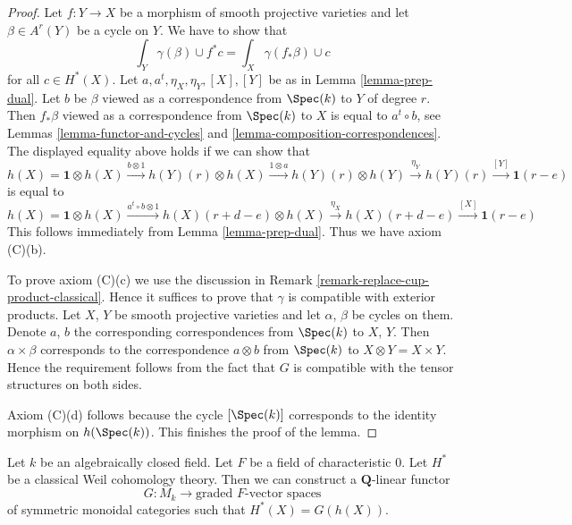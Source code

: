 \begin{proof}
\medskip\noindent
Let $f : Y \to X$ be a morphism of smooth projective varieties and
let $\beta \in A^r(Y)$ be a cycle on $Y$. We have to show that
$$
\int_Y \gamma(\beta) \cup f^*c = \int_X \gamma(f_*\beta) \cup c
$$
for all $c \in H^*(X)$. Let $a, a^t, \eta_X, \eta_Y, [X], [Y]$
be as in Lemma \ref{lemma-prep-dual}.
Let $b$ be $\beta$ viewed as a correspondence from $\Spec(k)$ to $Y$
of degree $r$. Then $f_*\beta$ viewed as a correspondence from
$\Spec(k)$ to $X$ is equal to $a^t \circ b$, see
Lemmas \ref{lemma-functor-and-cycles} and
\ref{lemma-composition-correspondences}.
The displayed equality above holds if we can show that
$$
h(X) = \mathbf{1} \otimes h(X)
\xrightarrow{b \otimes 1}
h(Y)(r) \otimes h(X)
\xrightarrow{1 \otimes a}
h(Y)(r) \otimes h(Y)
\xrightarrow{\eta_Y}
h(Y)(r)
\xrightarrow{[Y]}
\mathbf{1}(r - e)
$$
is equal to
$$
h(X) = \mathbf{1} \otimes h(X)
\xrightarrow{a^t \circ b \otimes 1}
h(X)(r + d - e) \otimes h(X)
\xrightarrow{\eta_X}
h(X)(r + d - e)
\xrightarrow{[X]}
\mathbf{1}(r - e)
$$
This follows immediately from Lemma \ref{lemma-prep-dual}.
Thus we have axiom (C)(b).

\medskip\noindent
To prove axiom (C)(c) we use the discussion in
Remark \ref{remark-replace-cup-product-classical}.
Hence it suffices to prove that $\gamma$ is compatible with
exterior products. Let $X$, $Y$ be smooth projective varieties and
let $\alpha$, $\beta$ be cycles on them. Denote
$a$, $b$ the corresponding correspondences from $\Spec(k)$ to
$X$, $Y$. Then $\alpha \times \beta$ corresponds to the
correspondence $a \otimes b$ from $\Spec(k)$ to $X \otimes Y = X \times Y$.
Hence the requirement follows from the fact that $G$ is
compatible with the tensor structures on both sides.

\medskip\noindent
Axiom (C)(d) follows because the cycle $[\Spec(k)]$
corresponds to the identity morphism on $h(\Spec(k))$.
This finishes the proof of the lemma.
\end{proof}

\begin{lemma}
\label{lemma-from-weil-to-functor-classical}
Let $k$ be an algebraically closed field. Let $F$ be a field of
characteristic $0$. Let $H^*$ be a classical Weil cohomology theory.
Then we can construct a $\mathbf{Q}$-linear functor
$$
G : M_k \longrightarrow \text{graded }F\text{-vector spaces}
$$
of symmetric monoidal categories such that $H^*(X) = G(h(X))$.
\end{lemma}


